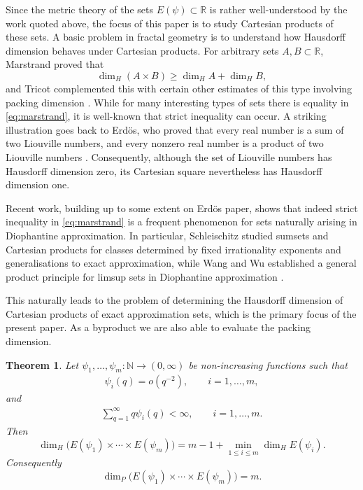 \documentclass[11pt]{amsart}
\numberwithin{equation}{section}
\newcommand{\R}{{\Bbb R}}
\newcommand{\N}{{\Bbb N}}
\newcommand{\0}{\mathbf{0}}
\newtheorem{theorem}{Theorem}[section]
\theoremstyle{remark}
\def\N{\mathbb N}
\def\R{\mathcal R}
\def\N{\mathbb N}
\def\N{\mathbb N}
\def\R{\mathbb R}
\newcommand{\dimH}{\dim_{H}}
\begin{document}
Since the metric theory of the sets $E(\psi)\subset \R$ is rather well-understood by the work quoted above, the focus of this paper is to study Cartesian products of these sets. A basic problem in fractal geometry is to understand how Hausdorff dimension behaves under
Cartesian products. For arbitrary sets $A,B\subset\R$, Marstrand proved that
\begin{equation}\label{eq:marstrand}
\dimH(A\times B)\geq \dimH A+\dimH B,
\end{equation}
and Tricot complemented this with certain
other estimates of this type involving
packing dimension \cite{Tricot1982, Marstrand}.
While for many interesting types of sets
there is equality in \eqref{eq:marstrand},
it is well-known that strict inequality can occur.
A striking illustration goes back to Erd\"{o}s, who proved that every real number is a sum of
two Liouville numbers, and every nonzero real number is a product of two Liouville numbers
\cite{Erdos1962}. Consequently, although the set of Liouville numbers has Hausdorff dimension zero, its
Cartesian square nevertheless has Hausdorff dimension one. 


Recent work, building up to some extent on Erd\"os paper, shows that indeed
strict inequality in \eqref{eq:marstrand} is a frequent
phenomenon for sets naturally arising in Diophantine approximation. In
particular, Schleischitz studied sumsets and Cartesian products for classes determined by fixed
irrationality exponents and generalisations
to
exact approximation, while Wang and Wu
established a general product principle for limsup sets in Diophantine approximation
\cite{Joh2023RM,WangWuTAMS}.

This naturally leads to the problem of determining the Hausdorff dimension of Cartesian products of exact approximation sets, which is the primary focus of the present paper. As a byproduct we are also able to evaluate the packing dimension.

\begin{theorem}\label{thm:main}
Let $\psi_1,\ldots,\psi_m:\N\to(0,\infty)$ be non-increasing functions such that
\begin{align}\label{condithm1}
\psi_i(q)=o(q^{-2}),
\qquad i=1,\dots,m,
\end{align}
and
\begin{align}\label{condithm2}
\sum_{q=1}^{\infty} q\psi_i(q)<\infty,
\qquad i=1,\ldots,m.
\end{align}
Then
\begin{equation} \label{eq:e1}
\dimH\bigl(E(\psi_1)\times\cdots\times E(\psi_m)\bigr)
=
m-1+\min_{1\leq i\leq m}\dimH E(\psi_i).
\end{equation}
Consequently
\begin{equation} \label{eq:packingd}
  \dim_P\bigl(E(\psi_1)\times\cdots\times E(\psi_m)\bigr)
=
m.
\end{equation}
\end{theorem}
\end{document}
